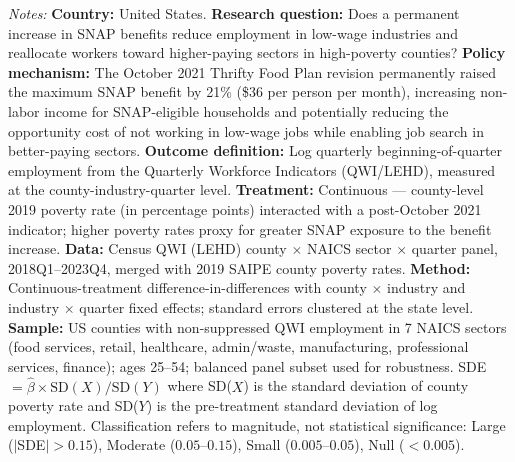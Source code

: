 \begin{table}[H]
\begin{adjustbox}{max width=\textwidth}
\begin{threeparttable}
\begin{tablenotes}[flushleft]
\item \textit{Notes:} \textbf{Country:} United States. \textbf{Research question:} Does a permanent increase in SNAP benefits reduce employment in low-wage industries and reallocate workers toward higher-paying sectors in high-poverty counties? \textbf{Policy mechanism:} The October 2021 Thrifty Food Plan revision permanently raised the maximum SNAP benefit by 21\% (\$36 per person per month), increasing non-labor income for SNAP-eligible households and potentially reducing the opportunity cost of not working in low-wage jobs while enabling job search in better-paying sectors. \textbf{Outcome definition:} Log quarterly beginning-of-quarter employment from the Quarterly Workforce Indicators (QWI/LEHD), measured at the county-industry-quarter level. \textbf{Treatment:} Continuous --- county-level 2019 poverty rate (in percentage points) interacted with a post-October 2021 indicator; higher poverty rates proxy for greater SNAP exposure to the benefit increase. \textbf{Data:} Census QWI (LEHD) county $\times$ NAICS sector $\times$ quarter panel, 2018Q1--2023Q4, merged with 2019 SAIPE county poverty rates. \textbf{Method:} Continuous-treatment difference-in-differences with county $\times$ industry and industry $\times$ quarter fixed effects; standard errors clustered at the state level. \textbf{Sample:} US counties with non-suppressed QWI employment in 7 NAICS sectors (food services, retail, healthcare, admin/waste, manufacturing, professional services, finance); ages 25--54; balanced panel subset used for robustness. SDE $= \hat{\beta} \times \text{SD}(X) / \text{SD}(Y)$ where SD($X$) is the standard deviation of county poverty rate and SD($Y$) is the pre-treatment standard deviation of log employment. Classification refers to magnitude, not statistical significance: Large ($|$SDE$| > 0.15$), Moderate ($0.05$--$0.15$), Small ($0.005$--$0.05$), Null ($< 0.005$).
\end{tablenotes}
\end{threeparttable}
\end{adjustbox}
\end{table}
